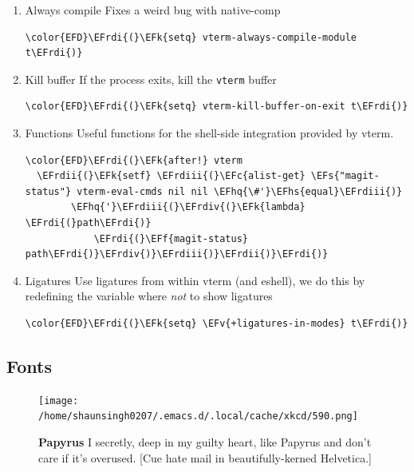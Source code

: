 \documentclass{scrartcl}
\newcommand{\EFk}[1]{\textcolor{EFk}{#1}} %
\newcommand{\EFs}[1]{\textcolor{EFs}{#1}} %
\newcommand{\EFc}[1]{\textcolor{EFc}{#1}} %
\newcommand{\EFv}[1]{\textcolor{EFv}{#1}} %
\newcommand{\EFf}[1]{\textcolor{EFf}{#1}} %
\newcommand{\EFhq}[1]{\textcolor{EFhq}{#1}} %
\newcommand{\EFhs}[1]{\textcolor{EFhs}{#1}} %
\newcommand{\EFrdi}[1]{\textcolor{EFrdi}{#1}} %
\newcommand{\EFrdii}[1]{\textcolor{EFrdii}{#1}} %
\newcommand{\EFrdiii}[1]{\textcolor{EFrdiii}{#1}} %
\newcommand{\EFrdiv}[1]{\textcolor{EFrdiv}{#1}} %
\begin{document}
\begin{enumerate}
\item Always compile
\label{sec:orgac75539}
Fixes a weird bug with native-comp
\begin{Code}
\begin{Verbatim}[]
\color{EFD}\EFrdi{(}\EFk{setq} vterm-always-compile-module t\EFrdi{)}
\end{Verbatim}
\end{Code}

\item Kill buffer
\label{sec:orgec768bb}
If the process exits, kill the \texttt{vterm} buffer
\begin{Code}
\begin{Verbatim}[]
\color{EFD}\EFrdi{(}\EFk{setq} vterm-kill-buffer-on-exit t\EFrdi{)}
\end{Verbatim}
\end{Code}

\item Functions
\label{sec:org8f1ffe6}
Useful functions for the shell-side integration provided by vterm.
\begin{Code}
\begin{Verbatim}[]
\color{EFD}\EFrdi{(}\EFk{after!} vterm
  \EFrdii{(}\EFk{setf} \EFrdiii{(}\EFc{alist-get} \EFs{"magit-status"} vterm-eval-cmds nil nil \EFhq{\#'}\EFhs{equal}\EFrdiii{)}
        \EFhq{'}\EFrdiii{(}\EFrdiv{(}\EFk{lambda} \EFrdi{(}path\EFrdi{)}
            \EFrdi{(}\EFf{magit-status} path\EFrdi{)}\EFrdiv{)}\EFrdiii{)}\EFrdii{)}\EFrdi{)}
\end{Verbatim}
\end{Code}

\item Ligatures
\label{sec:orgdd9a841}
Use ligatures from within vterm (and eshell), we do this by redefining the variable where \emph{not} to show ligatures
\begin{Code}
\begin{Verbatim}[]
\color{EFD}\EFrdi{(}\EFk{setq} \EFv{+ligatures-in-modes} t\EFrdi{)}
\end{Verbatim}
\end{Code}
\end{enumerate}

\subsection{Fonts}
\label{sec:org6e4ab57}
\begin{figure}[!htb]
	  \centering
	  \texttt{[image: /home/shaunsingh0207/.emacs.d/.local/cache/xkcd/590.png]}
  \caption*{\label{xkcd:590} \textbf{Papyrus} I secretly, deep in my guilty heart, like Papyrus and don't care if it's overused. [Cue hate mail in beautifully-kerned Helvetica.]}
	\end{figure}
\end{document}
